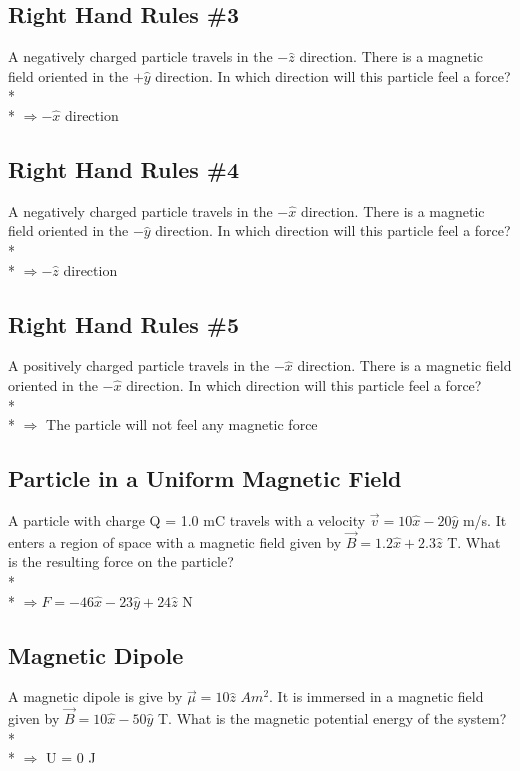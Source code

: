\documentclass[11pt]{article}
\begin{document}
\subsection{Right Hand Rules \#3}
A negatively charged particle travels in the $-\hat{z}$ direction.  There is a magnetic field oriented in the $+\hat{y}$ direction.  In which direction will this particle feel a force? \\* \\*
$\Rightarrow -\hat{x}$ direction

\subsection{Right Hand Rules \#4}
A negatively charged particle travels in the $-\hat{x}$ direction.  There is a magnetic field oriented in the $-\hat{y}$ direction.  In which direction will this particle feel a force? \\* \\*
$\Rightarrow -\hat{z}$ direction

\subsection{Right Hand Rules \#5}
A positively charged particle travels in the $-\hat{x}$ direction.  There is a magnetic field oriented in the $-\hat{x}$ direction.  In which direction will this particle feel a force? \\* \\*
$\Rightarrow$ The particle will not feel any magnetic force

\subsection{Particle in a Uniform Magnetic Field}
A particle with charge Q = 1.0 mC travels with a velocity $\vec{v} = 10 \hat{x} - 20 \hat{y}$ m/s.  It enters a region of space with a magnetic field given by $\vec{B} = 1.2 \hat{x} + 2.3 \hat{z}$ T.  What is the resulting force on the particle? \\* \\*
$\Rightarrow F = -46\hat{x} - 23\hat{y} + 24\hat{z}$ N

\subsection{Magnetic Dipole}
A magnetic dipole is give by $\vec{\mu} = 10 \hat{z}$ $Am^2$.  It is immersed in a magnetic field given by $\vec{B} = 10 \hat{x} - 50\hat{y}$ T.  What is the magnetic potential energy of the system? \\* \\*
$\Rightarrow$ U = 0 J
\end{document}
